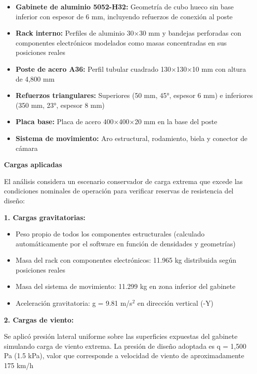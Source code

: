 \documentclass[12pt,a4paper,oneside]{report}
\begin{document}
\begin{itemize}
\item
  \textbf{Gabinete de aluminio 5052-H32:} Geometría de cubo hueco sin base inferior con espesor de 6 mm, incluyendo refuerzos de conexión al poste
\item
  \textbf{Rack interno:} Perfiles de aluminio 30\ensuremath{\times}30 mm y bandejas perforadas con componentes electrónicos modelados como masas concentradas en sus posiciones reales
\item
  \textbf{Poste de acero A36:} Perfil tubular cuadrado 130\ensuremath{\times}130\ensuremath{\times}10 mm con altura de 4,800 mm
\item
  \textbf{Refuerzos triangulares:} Superiores (50 mm, 45°, espesor 6 mm) e inferiores (350 mm, 23°, espesor 8 mm)
\item
  \textbf{Placa base:} Placa de acero 400\ensuremath{\times}400\ensuremath{\times}20 mm en la base del poste
\item
  \textbf{Sistema de movimiento:} Aro estructural, rodamiento, biela y conector de cámara
\end{itemize}

\textbf{Cargas aplicadas}

El análisis considera un escenario conservador de carga extrema que excede las condiciones nominales de operación para verificar reservas de resistencia del diseño:

\textbf{1. Cargas gravitatorias:}

\begin{itemize}
\item
  Peso propio de todos los componentes estructurales (calculado automáticamente por el software en función de densidades y geometrías)
\item
  Masa del rack con componentes electrónicos: 11.965 kg distribuida según posiciones reales
\item
  Masa del sistema de movimiento: 11.299 kg en zona inferior del gabinete
\item
  Aceleración gravitatoria: g = 9.81 m/s\ensuremath{^{2}} en dirección vertical (-Y)
\end{itemize}

\textbf{2. Cargas de viento:}

Se aplicó presión lateral uniforme sobre las superficies expuestas del gabinete simulando carga de viento extrema. La presión de diseño adoptada es q = 1,500 Pa (1.5 kPa), valor que corresponde a velocidad de viento de aproximadamente 175 km/h
\end{document}
